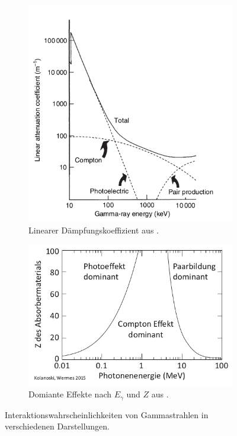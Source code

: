 \begin{figure}
    \centering
    \begin{subfigure}{.5\textwidth}
        \centering
        \includegraphics[width=0.9\linewidth]{./Bilder/E_mu_Gilmore.png}%
        \caption{Linearer Dämpfungskoeffizient aus \cite{book:gil}.}\label{fig:mu}
    \end{subfigure}%
    \begin{subfigure}{.5\textwidth}
        \centering
        \includegraphics[width=0.9\linewidth]{./Bilder/E_Z_Kolanoski.png}
        \caption{Domiante Effekte nach $E_\gamma$ und $Z$ aus \cite{book:kolano}.}\label{fig:z}
    \end{subfigure}
    \caption{Interaktionswahrscheinlichkeiten von Gammastrahlen in verschiedenen Darstellungen.}\label{}
\end{figure}



